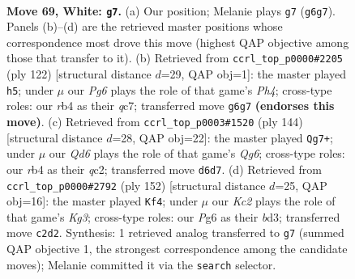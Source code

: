 \documentclass[11pt]{article}
\begin{document}
\clearpage

\begin{figure}[p]\centering
\begin{subfigure}{0.46\textwidth}\centering
\resizebox{\linewidth}{!}{%
\newchessgame
\chessboard[
  setfen={8/8/3Q2P1/4P2P/1rk5/8/2K5/8 w - - 5 69},
  showmover=false,
  pgfstyle=straightmove, color=movearrow, markmove={g6-g7}
]}
\caption{}
\end{subfigure}\hfill
\begin{subfigure}{0.46\textwidth}\centering
\resizebox{\linewidth}{!}{%
\newchessgame
\chessboard[
  setfen={8/2q4k/5Q2/8/6KP/6P1/8/8 w - - 5 62},
  showmover=false,
  pgfstyle=straightmove, color=movearrow, markmove={h4-h5}
]}
\caption{}
\end{subfigure}
\\[4pt]
\begin{subfigure}{0.46\textwidth}\centering
\resizebox{\linewidth}{!}{%
\newchessgame
\chessboard[
  setfen={8/8/6Q1/7P/8/p1k2P1K/2q5/8 w - - 7 73},
  showmover=false,
  pgfstyle=straightmove, color=movearrow, markmove={g6-g7}
]}
\caption{}
\end{subfigure}\hfill
\begin{subfigure}{0.46\textwidth}\centering
\resizebox{\linewidth}{!}{%
\newchessgame
\chessboard[
  setfen={8/8/2kr4/4Q1P1/8/3b2K1/8/8 w - - 9 77},
  showmover=false,
  pgfstyle=straightmove, color=movearrow, markmove={g3-f4}
]}
\caption{}
\end{subfigure}
\caption{\textbf{Move 69, White: \texttt{g7}.} (a) Our position; Melanie plays \texttt{g7} (\texttt{g6g7}). Panels (b)--(d) are the retrieved master positions whose correspondence most drove this move (highest QAP objective among those that transfer to it). (b) Retrieved from \texttt{ccrl\_top\_p0000\#2205} (ply 122) [structural distance $d$=29, QAP obj=1]: the master played \texttt{h5}; under $\mu$ our \emph{Pg6} plays the role of that game's \emph{Ph4}; cross-type roles: our \emph{r}b4 as their \emph{q}c7; transferred move \texttt{g6g7} \textbf{(endorses this move)}. (c) Retrieved from \texttt{ccrl\_top\_p0003\#1520} (ply 144) [structural distance $d$=28, QAP obj=22]: the master played \texttt{Qg7+}; under $\mu$ our \emph{Qd6} plays the role of that game's \emph{Qg6}; cross-type roles: our \emph{r}b4 as their \emph{q}c2; transferred move \texttt{d6d7}. (d) Retrieved from \texttt{ccrl\_top\_p0000\#2792} (ply 152) [structural distance $d$=25, QAP obj=16]: the master played \texttt{Kf4}; under $\mu$ our \emph{Kc2} plays the role of that game's \emph{Kg3}; cross-type roles: our \emph{P}g6 as their \emph{b}d3; transferred move \texttt{c2d2}. Synthesis: 1 retrieved analog transferred to \texttt{g7} (summed QAP objective 1, the strongest correspondence among the candidate moves); Melanie committed it via the \texttt{search} selector.}
\label{fig:thought-m136}
\end{figure}
\end{document}
